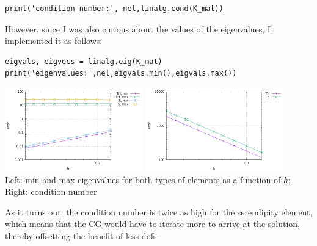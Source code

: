 \begin{lstlisting}
print('condition number:', nel,linalg.cond(K_mat))
\end{lstlisting}
However, since I was also curious about the values of the eigenvalues, I implemented 
it as follows:
\begin{lstlisting}
eigvals, eigvecs = linalg.eig(K_mat)
print('eigenvalues:',nel,eigvals.min(),eigvals.max())
\end{lstlisting}



\begin{center}
\includegraphics[width=6cm]{python_codes/fieldstone_52/images/eigenvalues.pdf}
\includegraphics[width=6cm]{python_codes/fieldstone_52/images/eigenvalues_ratio.pdf}\\
{\small Left: min and max eigenvalues for both types of elements as a function of $h$; 
Right: condition number}
\end{center}
As it turns out, the condition number is twice as high for the serendipity element, 
which means that the CG would have to iterate more to arrive at the solution, 
thereby offsetting the benefit of less dofs.





